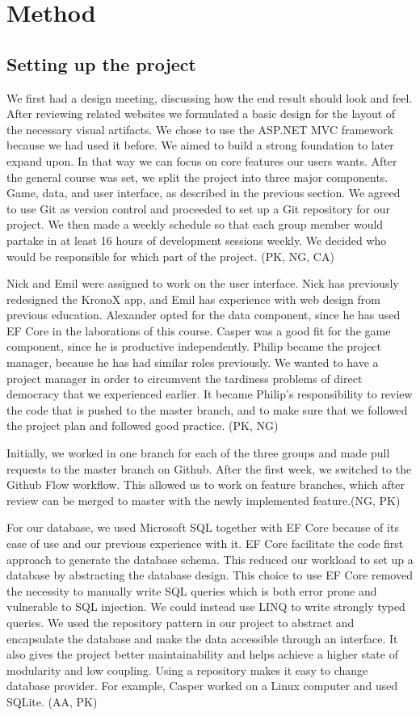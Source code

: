 \documentclass[acmlarge, review=false, screen=true]{acmart}
\begin{document}
\section{Method}
  \subsection{Setting up the project}
    We first had a design meeting, discussing how the end result should look and feel. After reviewing related websites we formulated a basic design for the layout of the necessary visual artifacts. We chose to use the ASP.NET MVC framework because we had used it before. We aimed to build a strong foundation to later expand upon. In that way we can focus on core features our users wants. After the general course was set, we split the project into three major components. Game, data, and user interface, as described in the previous section. We agreed to use Git as version control and proceeded to set up a Git repository for our project. We then made a weekly schedule so that each group member would partake in at least 16 hours of development sessions weekly. We decided who would be responsible for which part of the project. (PK, NG, CA)

    Nick and Emil were assigned to work on the user interface. Nick has previously redesigned the KronoX app, and Emil has experience with web design from previous education\cite{nick}. Alexander opted for the data component, since he has used EF Core in the laborations of this course. Casper was a good fit for the game component, since he is productive independently. Philip became the project manager, because he has had similar roles previously. We wanted to have a project manager in order to circumvent the tardiness problems of direct democracy that we experienced earlier. It became Philip’s responsibility to review the code that is pushed to the master branch, and to make sure that we followed the project plan and followed good practice. (PK, NG)

    Initially, we worked in one branch for each of the three groups and made pull requests to the master branch on Github. After the first week, we switched to the Github Flow workflow\cite{githubflow}. This allowed us to work on feature branches, which after review can be merged to master with the newly implemented feature.(NG, PK)

    For our database, we used Microsoft SQL together with EF Core because of its ease of use and our previous experience with it. EF Core facilitate the code first approach to generate the database schema. This reduced our workload to set up a database by abstracting the database design. This choice to use EF Core removed the necessity to manually write SQL queries which is both error prone and vulnerable to SQL injection. We could instead use LINQ to write strongly typed queries. We used the repository pattern in our project to abstract and encapsulate the database and make the data accessible through an interface. It also gives the project better maintainability and helps achieve a higher state of modularity and low coupling. Using a repository makes it easy to change database provider. For example, Casper worked on a Linux computer and used SQLite. (AA, PK)
\end{document}

